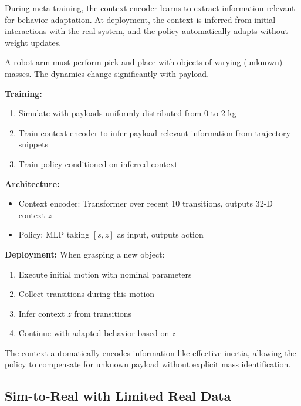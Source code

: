During meta-training, the context encoder learns to extract information relevant for behavior adaptation. At deployment, the context is inferred from initial interactions with the real system, and the policy automatically adapts without weight updates.

\begin{example}
\label{ex:context_conditional_payload}
A robot arm must perform pick-and-place with objects of varying (unknown) masses. The dynamics change significantly with payload.

\textbf{Training:}
\begin{enumerate}
    \item Simulate with payloads uniformly distributed from 0 to 2 kg
    \item Train context encoder to infer payload-relevant information from trajectory snippets
    \item Train policy conditioned on inferred context
\end{enumerate}

\textbf{Architecture:}
\begin{itemize}
    \item Context encoder: Transformer over recent 10 transitions, outputs 32-D context $z$
    \item Policy: MLP taking $[s, z]$ as input, outputs action
\end{itemize}

\textbf{Deployment:}
When grasping a new object:
\begin{enumerate}
    \item Execute initial motion with nominal parameters
    \item Collect transitions during this motion
    \item Infer context $z$ from transitions
    \item Continue with adapted behavior based on $z$
\end{enumerate}

The context automatically encodes information like effective inertia, allowing the policy to compensate for unknown payload without explicit mass identification.
\end{example}

\subsection{Sim-to-Real with Limited Real Data}


